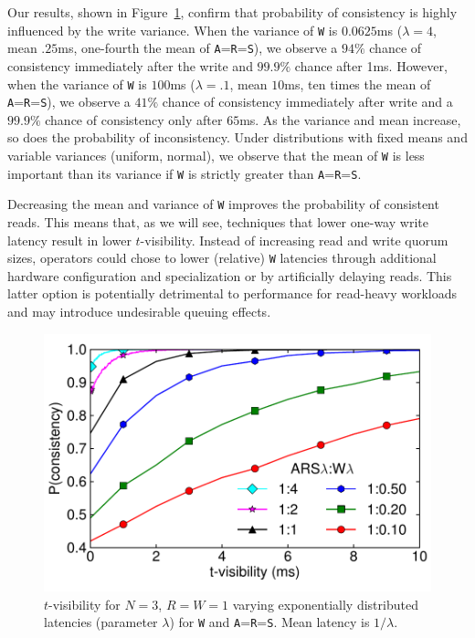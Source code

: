 \documentclass{vldb}
\begin{document}
Our results, shown in Figure~\ref{fig:varydelay}, confirm that
probability of consistency is highly influenced by the write variance.
When the variance of \texttt{W} is $0.0625$ms ($\lambda=4$, mean
$.25$ms, one-fourth the mean of \texttt{A}=\texttt{R}=\texttt{S}), we
observe a $94\%$ chance of consistency immediately after the write and
$99.9\%$ chance after 1ms.  However, when the variance of \texttt{W}
is $100$ms ($\lambda=.1$, mean $10$ms, ten times the mean of
\texttt{A}=\texttt{R}=\texttt{S}), we observe a $41\%$ chance of
consistency immediately after write and a $99.9\%$ chance of
consistency only after $65$ms.  As the variance and mean increase, so
does the probability of inconsistency.  Under distributions with fixed
means and variable variances (uniform, normal), we observe that the
mean of \texttt{W} is less important than its variance if 
\texttt{W} is strictly greater than \texttt{A}=\texttt{R}=\texttt{S}.

Decreasing the mean and variance of \texttt{W} improves the
probability of consistent reads.  This means that, as we will see,
techniques that lower one-way write latency result in lower
$t$-visibility.  Instead of increasing read and write quorum sizes,
operators could chose to lower (relative) \texttt{W} latencies through
additional hardware configuration and specialization or by
artificially delaying reads.  This latter option is potentially
detrimental to performance for read-heavy workloads and may introduce
undesirable queuing effects.

\begin{figure}
\centering
\includegraphics[width=.85\columnwidth]{figs/rwratio.pdf}
\vspace{-14pt}
\caption{$t$-visibility for $N$$=$$3$, $R$$=$$W$$=$$1$ varying
  exponentially distributed latencies (parameter $\lambda$) for
  \texttt{W} and \texttt{A}=\texttt{R}=\texttt{S}.  Mean latency is
  $1/\lambda$.}
\vspace{-4pt}
\label{fig:varydelay}
\end{figure}
\end{document}
